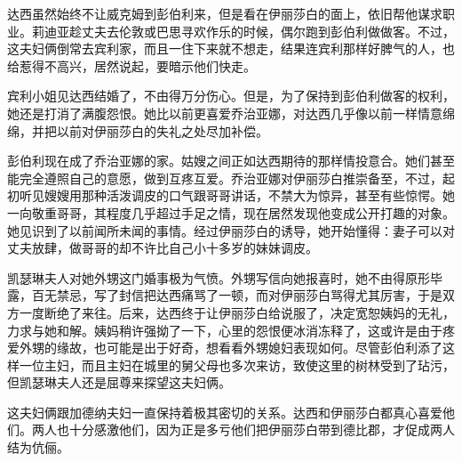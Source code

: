 \par 达西虽然始终不让威克姆到彭伯利来，但是看在伊丽莎白的面上，依旧帮他谋求职业。莉迪亚趁丈夫去伦敦或巴思寻欢作乐的时候，偶尔跑到彭伯利做做客。不过，这夫妇俩倒常去宾利家，而且一住下来就不想走，结果连宾利那样好脾气的人，也给惹得不高兴，居然说起，要暗示他们快走。
\par 宾利小姐见达西结婚了，不由得万分伤心。但是，为了保持到彭伯利做客的权利，她还是打消了满腹怨恨。她比以前更喜爱乔治亚娜，对达西几乎像以前一样情意绵绵，并把以前对伊丽莎白的失礼之处尽加补偿。
\par 彭伯利现在成了乔治亚娜的家。姑嫂之间正如达西期待的那样情投意合。她们甚至能完全遵照自己的意愿，做到互疼互爱。乔治亚娜对伊丽莎白推崇备至，不过，起初听见嫂嫂用那种活泼调皮的口气跟哥哥讲话，不禁大为惊异，甚至有些惊愕。她一向敬重哥哥，其程度几乎超过手足之情，现在居然发现他变成公开打趣的对象。她见识到了以前闻所未闻的事情。经过伊丽莎白的诱导，她开始懂得：妻子可以对丈夫放肆，做哥哥的却不许比自己小十多岁的妹妹调皮。
\par 凯瑟琳夫人对她外甥这门婚事极为气愤。外甥写信向她报喜时，她不由得原形毕露，百无禁忌，写了封信把达西痛骂了一顿，而对伊丽莎白骂得尤其厉害，于是双方一度断绝了来往。后来，达西终于让伊丽莎白给说服了，决定宽恕姨妈的无礼，力求与她和解。姨妈稍许强拗了一下，心里的怨恨便冰消冻释了，这或许是由于疼爱外甥的缘故，也可能是出于好奇，想看看外甥媳妇表现如何。尽管彭伯利添了这样一位主妇，而且主妇在城里的舅父母也多次来访，致使这里的树林受到了玷污，但凯瑟琳夫人还是屈尊来探望这夫妇俩。
\par 这夫妇俩跟加德纳夫妇一直保持着极其密切的关系。达西和伊丽莎白都真心喜爱他们。两人也十分感激他们，因为正是多亏他们把伊丽莎白带到德比郡，才促成两人结为伉俪。












